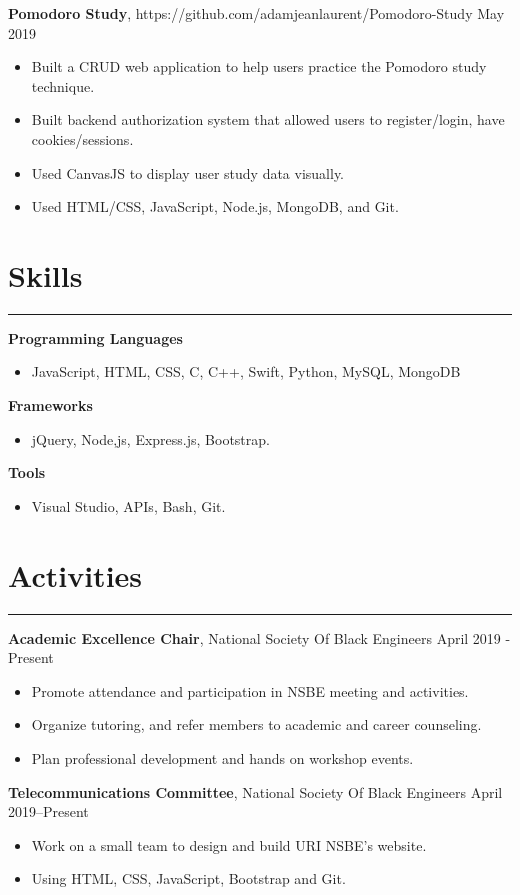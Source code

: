 \documentclass[11pt]{article}
\newcommand{\resumesection}[1]{\vspace{-0.2cm}\section*{#1}\vspace{-0.2cm}\hrule\vspace{0.2cm}}
\begin{document}
\textbf{Pomodoro Study}, https://github.com/adamjeanlaurent/Pomodoro-Study \hfill May 2019
\begin{itemize}
	\item Built a CRUD web application to help users practice the Pomodoro study technique.
	\item  Built backend authorization system that allowed users to register/login, have cookies/sessions.
	\item Used CanvasJS to display user study data visually.
	\item Used HTML/CSS, JavaScript, Node.js, MongoDB, and Git.
\end{itemize}

\resumesection{Skills}

\textbf{Programming Languages}
\begin{itemize}
	\item JavaScript, HTML, CSS, C, C++, Swift, Python, MySQL, MongoDB
\end{itemize}

\textbf{Frameworks}
\begin{itemize}
	\item jQuery, Node,js, Express.js, Bootstrap.
\end{itemize}

\textbf{Tools}
\begin{itemize}
	\item Visual Studio, APIs, Bash, Git.
\end{itemize}

\resumesection{Activities}

\textbf{Academic Excellence Chair}, National Society Of Black Engineers \hfill April 2019 - Present
\begin{itemize}
	\item Promote attendance and participation in NSBE meeting and activities.
	\item Organize tutoring, and refer members to academic and career counseling.
	\item Plan professional development and hands on workshop events.
\end{itemize}

\textbf{Telecommunications Committee}, National Society Of Black Engineers \hfill April 2019--Present
\begin{itemize}
	\item Work on a small team to design and build URI NSBE's website.
	\item Using HTML, CSS, JavaScript, Bootstrap and Git.
\end{itemize}
\end{document}
